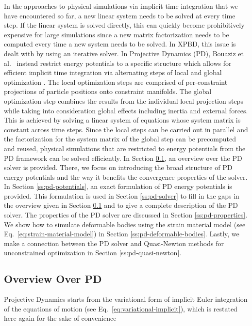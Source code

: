 In the approaches to physical simulations via implicit time integration that we have encountered so far, a new linear system needs to be solved
at every time step. If the linear system is solved directly, this can quickly become prohibitively expensive for large simulations since 
a new matrix factorization needs to be computed every time a new system needs to be solved. In XPBD, this issue is dealt with by using an iterative 
solver. In Projective Dynamics (PD), Bouaziz et al.\ \cite{bouaziz2014} instead restrict energy potentials to a specific structure 
which allows for efficient implicit time integration via alternating steps of local and global optimization \cite{bouaziz2014}. The local 
optimization steps are comprised of per-constraint projections of particle positions onto constraint manifolds. The global optimization 
step combines the results from the individual 
local projection steps while taking into consideration global effects including inertia and external forces. This is achieved by solving a 
linear system of equations whose system matrix is constant across time steps. Since the local steps can be carried out in parallel and the 
factorization for the system matrix of the global step can be precomputed and reused, physical simulations that are restricted to energy 
potentials from the PD framework can be solved efficiently. In Section \ref{ss:pd-overview}, an overview over the PD solver is provided. There, 
we focus on introducing the broad structure of PD energy potentials and the way it benefits the convergence properties of the solver. In 
Section \ref{ss:pd-potentials}, an exact formulation of PD energy potentials is provided. This formulation is used in Section \ref{ss:pd-solver} 
to fill in the gaps in the overview given in Section \ref{ss:pd-overview} and to give a complete description of the PD solver. The 
properties of the PD solver are discussed in Section \ref{ss:pd-properties}. We show how to simulate deformable bodies using the strain 
material model (see Eq.\ \ref{eq:strain-material-model}) in Section \ref{ss:pd-deformable-bodies}. Lastly, we make a connection between the PD 
solver and Quasi-Newton methods for unconstrained optimization in Section \ref{ss:pd-quasi-newton}.

\subsection{Overview Over PD}\label{ss:pd-overview}
Projective Dynamics starts from the variational form of implicit Euler integration of the equations of motion (see Eq.\ \ref{eq:variational-implicit}),
which is restated here again for the sake of convenience

